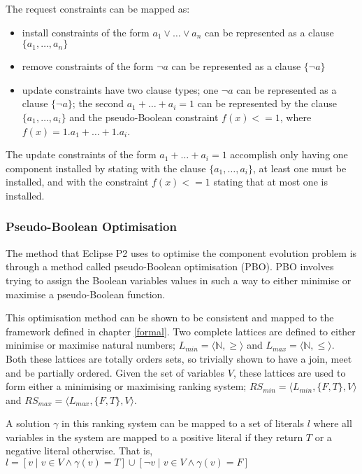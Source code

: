 The request constraints can be mapped as:
\begin{itemize}
      \item install constraints of the form $a_1 \vee \ldots \vee a_n$  can be represented as a clause $\{a_1,\ldots,a_n\}$
      \item remove constraints of the form $\neg a$ can be represented as a clause $\{\neg a\}$
      \item update constraints have two clause types; one $\neg a$ can be represented as a clause $\{\neg a\}$;
      the second $a_1 + \ldots + a_i = 1$ can be represented by the clause $\{a_1,\ldots,a_i\}$ 
      and the pseudo-Boolean constraint $f(x) <= 1$, where $f(x) = 1.a_1 + \ldots + 1.a_i$.
\end{itemize}

The update constraints of the form $a_1 + \ldots + a_i = 1$ accomplish only having one component installed by stating with the clause $\{a_1,\ldots,a_i\}$, at least one must be installed,
and with the constraint $f(x) <=1$ stating that at most one is installed.

\subsubsection{Pseudo-Boolean Optimisation}
The method that Eclipse P2 uses to optimise the component evolution problem is through a method called pseudo-Boolean optimisation (PBO).
PBO involves trying to assign the Boolean variables values in such a way to either minimise or maximise a pseudo-Boolean function.

This optimisation method can be shown to be consistent and mapped to the framework defined in chapter \ref{formal}.
Two complete lattices are defined to either minimise or maximise natural numbers; $L_{min} = \langle \mathbb{N}, \geq \rangle$ and $L_{max} = \langle \mathbb{N}, \leq \rangle$.
Both these lattices are totally orders sets, so trivially shown to have a join, meet and be partially ordered.
Given the set of variables $V$, these lattices are used to form either a minimising or maximising  ranking system;
$RS_{min} = \langle L_{min}, \{F,T\}, V \rangle$ and $RS_{max} = \langle L_{max}, \{F,T\}, V \rangle$. 

A solution $\gamma$ in this ranking system can be mapped to a set of literals $l$
where all variables in the system are mapped to a positive literal if they return $T$ or a negative literal otherwise.
That is, $l = [v \mid v \in V \wedge \gamma(v) = T] \cup [\neg v \mid v \in V \wedge \gamma(v) = F]$

